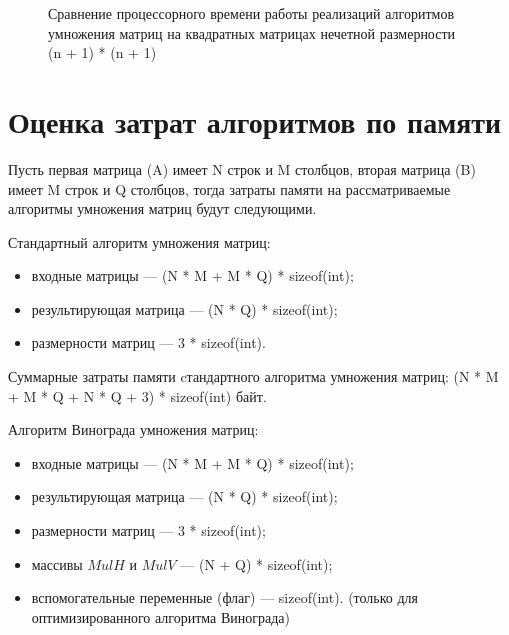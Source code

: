 \begin{figure}[h!]
	
	
	\caption{Сравнение процессорного времени работы реализаций алгоритмов умножения матриц на квадратных матрицах нечетной размерности (n + 1) * (n + 1)}
	
	\label{fig:fig2}
	
\end{figure}


\section{Оценка затрат алгоритмов по памяти}

Пусть первая матрица (A) имеет N строк и M столбцов, вторая матрица (B) имеет M строк и Q столбцов, тогда затраты памяти на рассматриваемые алгоритмы умножения матриц будут следующими.

Стандартный алгоритм умножения матриц:
\begin{itemize}
\item входные матрицы --- (N * M + M * Q) * sizeof(int); 
\item результирующая матрица --- (N * Q) * sizeof(int); 
\item размерности матриц ---  3 * sizeof(int).
\end{itemize}

Суммарные затраты памяти cтандартного алгоритма умножения матриц:
(N * M + M * Q + N * Q + 3) * sizeof(int) байт.

Алгоритм Винограда умножения матриц:
\begin{itemize}
\item входные матрицы --- (N * M + M * Q) * sizeof(int); 
\item результирующая матрица --- (N * Q) * sizeof(int); 
\item размерности матриц ---  3 * sizeof(int);
\item массивы $MulH$ и $MulV$ --- (N + Q) * sizeof(int);
\item вспомогательные переменные (флаг) --- sizeof(int). (только для оптимизированного алгоритма Винограда)
\end{itemize}

